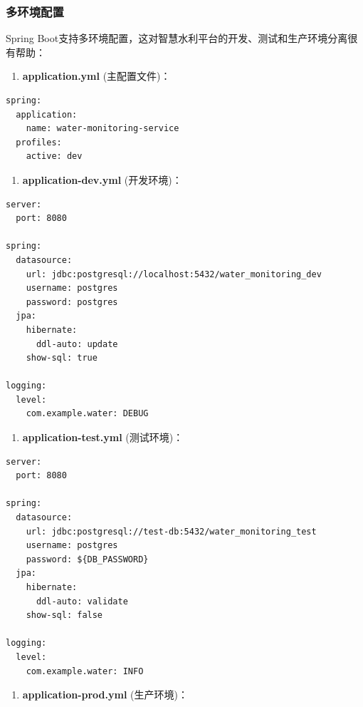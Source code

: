 \subsubsection{多环境配置}\label{ux591aux73afux5883ux914dux7f6e}

Spring
Boot支持多环境配置，这对智慧水利平台的开发、测试和生产环境分离很有帮助：

\begin{enumerate}
\def\labelenumi{\arabic{enumi}.}
\tightlist
\item
  \textbf{application.yml} (主配置文件)：
\end{enumerate}

\begin{lstlisting}
spring:
  application:
    name: water-monitoring-service
  profiles:
    active: dev
\end{lstlisting}

\begin{enumerate}
\def\labelenumi{\arabic{enumi}.}
\setcounter{enumi}{1}
\tightlist
\item
  \textbf{application-dev.yml} (开发环境)：
\end{enumerate}

\begin{lstlisting}
server:
  port: 8080

spring:
  datasource:
    url: jdbc:postgresql://localhost:5432/water_monitoring_dev
    username: postgres
    password: postgres
  jpa:
    hibernate:
      ddl-auto: update
    show-sql: true

logging:
  level:
    com.example.water: DEBUG
\end{lstlisting}

\begin{enumerate}
\def\labelenumi{\arabic{enumi}.}
\setcounter{enumi}{2}
\tightlist
\item
  \textbf{application-test.yml} (测试环境)：
\end{enumerate}

\begin{lstlisting}
server:
  port: 8080

spring:
  datasource:
    url: jdbc:postgresql://test-db:5432/water_monitoring_test
    username: postgres
    password: ${DB_PASSWORD}
  jpa:
    hibernate:
      ddl-auto: validate
    show-sql: false

logging:
  level:
    com.example.water: INFO
\end{lstlisting}

\begin{enumerate}
\def\labelenumi{\arabic{enumi}.}
\setcounter{enumi}{3}
\tightlist
\item
  \textbf{application-prod.yml} (生产环境)：
\end{enumerate}


